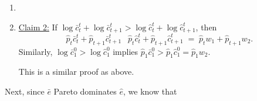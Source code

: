 \documentclass[11pt,english]{article}
\begin{document}
\begin{enumerate}
\begin{solution}
\begin{enumerate}
\begin{proof}
Suppose $\log \bar{c}_t^t + \log \bar{c}_{t+1}^t \geq \log \hat{c}_t^t + \log \hat{c}_{t+1}^t$ but, for contradiction,
\[
  \hat{p}_t \bar{c}_t^t + \hat{p}_{t+1} \bar{c}_{t+1}^t < \hat{p}_t w_1 + \hat{p}_{t+1} w_2.
\]
Then we can construct a new allocation.  Define
\[
  \bar{\bar{c}}_t^t
  \;=\;
  \bar{c}_t^t
  \;+\;
  \frac{\hat{p}_t w_1 + \hat{p}_{t+1} w_2 - \hat{p}_t \bar{c}_t^t - \hat{p}_{t+1}\bar{c}_{t+1}^t}{\hat{p}_t}
  \;>\; \bar{c}_t^t,
\]
and set $\bar{\bar{c}}_{t+1}^t = \bar{c}_{t+1}^t$.  Then
 
\begin{align*}
  \log \bar{\bar{c}}_t^t + \log \bar{\bar{c}}_{t+1}^t
  &> \log \bar{c}_t^t + \log \bar{c}_{t+1}^t \\
  &\geq \log \hat{c}_t^t + \log \hat{c}_{t+1}^t,
\end{align*}
with budget constraint satisfied:
\begin{align*}
  \hat{p}_t \bar{\bar{c}}_t^t + \hat{p}_{t+1} \bar{\bar{c}}_{t+1}^t
  &= \hat{p}_t \bar{c}_t^t
    + \hat{p}_t w_1 + \hat{p}_{t+1} w_2
    - \hat{p}_t \bar{c}_t^t
    - \hat{p}_{t+1}\bar{c}_{t+1}^t
    + \hat{p}_{t+1}\bar{c}_{t+1}^t \\
  &= \hat{p}_t w_1 + \hat{p}_{t+1} w_2.
\end{align*}
But this contradicts $(\hat{c}_t^t, \hat{c}_{t+1}^t)$ being the solution to generation $t$'s maximization problem.
\end{proof}
 
\item \item \underline{Claim 2:} If $\log \bar{c}_t^t + \log \bar{c}_{t+1}^t > \log \hat{c}_t^t + \log \hat{c}_{t+1}^t$, then
\[
  \hat{p}_t \bar{c}_t^t + \hat{p}_{t+1} \bar{c}_{t+1}^t
  \;\>\;
  \hat{p}_t \hat{c}_t^t + \hat{p}_{t+1} \hat{c}_{t+1}^t
  \;=\; \hat{p}_t w_1 + \hat{p}_{t+1} w_2.
\]
Similarly, $\log \bar{c}_1^0 > \log \hat{c}_1^0$ implies $\hat{p}_1 \bar{c}_1^0 > \hat{p}_1 \hat{c}_1^0 = \hat{p}_1 w_2$.

This is a similar proof as above.
\end{enumerate}
 
Next, since $\bar{e}$ Pareto dominates $\hat{e}$, we know that
 

\end{solution}
\end{enumerate}
\end{document}
